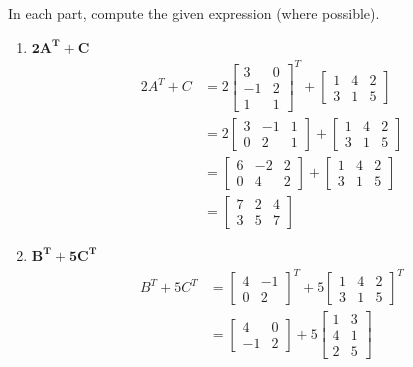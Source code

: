 \documentclass[
  letterpaper,
  DIV=11,
  numbers=noendperiod]{scrartcl}
\begin{document}
In each part, compute the given expression (where possible).

\begin{enumerate}
\def\labelenumi{\arabic{enumi}.}
\setcounter{enumi}{1}
\item
  \(\symbf{2A^T + C}\) \begin{align*}
  2A^T + C &= 2\begin{bmatrix}3 & 0 \\ -1 & 2 \\ 1 & 1 \end{bmatrix}^T + \begin{bmatrix} 1 & 4 & 2 \\ 3 & 1 & 5 \end{bmatrix} \\ 
  &= 2\begin{bmatrix}3 & -1 & 1 \\ 0 & 2 & 1 \end{bmatrix} + \begin{bmatrix} 1 & 4 & 2 \\ 3 & 1 & 5 \end{bmatrix} \\
  &= \begin{bmatrix} 6 & -2 & 2 \\ 0 & 4 & 2 \end{bmatrix} + \begin{bmatrix} 1 & 4 & 2 \\ 3 & 1 & 5 \end{bmatrix} \\
  &= \begin{bmatrix} 7 & 2 & 4 \\ 3 & 5 & 7 \end{bmatrix}
  \end{align*}
\item
  \(\symbf{B^T + 5C^T}\) \begin{align*}
  B^T + 5C^T &= \begin{bmatrix}4 & -1 \\ 0 & 2 \end{bmatrix}^T + 5\begin{bmatrix} 1 & 4 & 2 \\ 3 & 1 & 5 \end{bmatrix}^T \\
  &= \begin{bmatrix}4 & 0 \\ -1 & 2 \end{bmatrix} + 5\begin{bmatrix} 1 & 3 \\ 4 & 1 \\ 2 & 5 \end{bmatrix} \\

\end{align*}
\end{enumerate}
\end{document}
